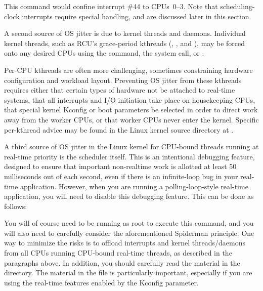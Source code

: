 This command would confine interrupt \#44 to CPUs~0--3.
Note that scheduling-clock interrupts require special handling, and are
discussed later in this section.

A second source of OS jitter is due to kernel threads and daemons.
Individual kernel threads, such as RCU's grace-period kthreads
(, , and ), may be forced
onto any desired CPUs using the  command, the
 system call, or .

Per-CPU kthreads are often more challenging, sometimes constraining
hardware configuration and workload layout.
Preventing OS jitter from these kthreads requires either that certain
types of hardware
not be attached to real-time systems, that all interrupts and I/O
initiation take place on housekeeping CPUs, that special kernel
Kconfig or boot parameters be selected in order to direct work away from
the worker CPUs, or that worker CPUs never enter the kernel.
Specific per-kthread advice may be found in the Linux kernel source
 directory at .

A third source of OS jitter in the Linux kernel for CPU-bound threads
running at real-time priority is the scheduler itself.
This is an intentional debugging feature, designed to ensure that
important non-realtime work is allotted at least 50 milliseconds
out of each second, even if there is an infinite-loop bug in
your real-time application.
However, when you are running a polling-loop-style real-time application,
you will need to disable this debugging feature.
This can be done as follows:


You will of course need to be running as root to execute this command,
and you will also need to carefully consider the aforementioned Spiderman
principle.
One way to minimize the risks is to offload interrupts and
kernel threads/daemons from all CPUs running CPU-bound real-time
threads, as described in the paragraphs above.
In addition, you should carefully read the material in the
 directory.
The material in the  file is particularly
important, especially if you are using the  real-time features
enabled by the  Kconfig parameter.

